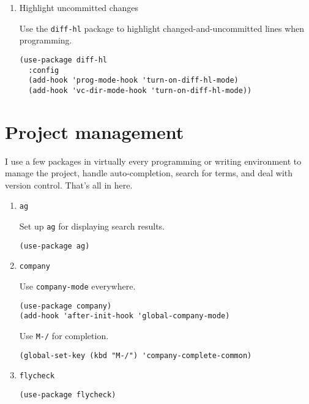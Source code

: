 \documentclass{article}
\begin{document}
\begin{enumerate}
\begin{verbatim}
(global-hl-line-mode)
\end{verbatim}

\item Highlight uncommitted changes
\label{sec:orgde0783d}

Use the \texttt{diff-hl} package to highlight changed-and-uncommitted lines when
programming.

\begin{verbatim}
(use-package diff-hl
  :config
  (add-hook 'prog-mode-hook 'turn-on-diff-hl-mode)
  (add-hook 'vc-dir-mode-hook 'turn-on-diff-hl-mode))
\end{verbatim}
\end{enumerate}

\section{Project management}
\label{sec:org9030bd6}

I use a few packages in virtually every programming or writing environment to
manage the project, handle auto-completion, search for terms, and deal with
version control. That's all in here.

\begin{enumerate}
\item \texttt{ag}
\label{sec:org48d20e2}

Set up \texttt{ag} for displaying search results.

\begin{verbatim}
(use-package ag)
\end{verbatim}

\item \texttt{company}
\label{sec:org546959c}

Use \texttt{company-mode} everywhere.

\begin{verbatim}
(use-package company)
(add-hook 'after-init-hook 'global-company-mode)
\end{verbatim}

Use \texttt{M-/} for completion.

\begin{verbatim}
(global-set-key (kbd "M-/") 'company-complete-common)
\end{verbatim}


\item \texttt{flycheck}
\label{sec:orgb07a4a5}

\begin{verbatim}
(use-package flycheck)
\end{verbatim}
\end{enumerate}
\end{document}
